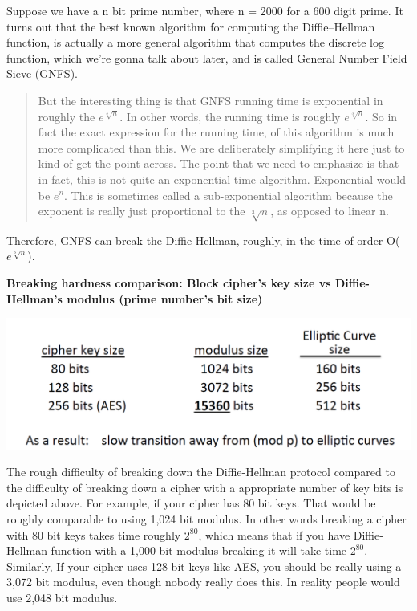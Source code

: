 \documentclass[11pt]{article}
\makeatletter
\def\maxwidth{\ifdim\Gin@nat@width>\linewidth\linewidth
    \else\Gin@nat@width\fi}
\let\Oldincludegraphics\includegraphics
\renewcommand{\includegraphics}[1]{\Oldincludegraphics[width=.8\maxwidth]{#1}}
\makeatother
\begin{document}
Suppose we have a n bit prime number, where n = 2000 for a 600 digit
prime. It turns out that the best known algorithm for computing the
Diffie--Hellman function, is actually a more general algorithm that
computes the discrete log function, which we're gonna talk about later,
and is called General Number Field Sieve (GNFS).

\begin{quote}
But the interesting thing is that GNFS running time is exponential in
roughly the \(e^\sqrt[3]{n}\). In other words, the running time is
roughly \(e^\sqrt[3]{n}\). So in fact the exact expression for the
running time, of this algorithm is much more complicated than this. We
are deliberately simplifying it here just to kind of get the point
across. The point that we need to emphasize is that in fact, this is not
quite an exponential time algorithm. Exponential would be \(e^{n}\).
This is sometimes called a sub-exponential algorithm because the
exponent is really just proportional to the \(\sqrt[3]{n}\), as opposed
to linear n.
\end{quote}

Therefore, GNFS can break the Diffie-Hellman, roughly, in the time of
order O(\(e^\sqrt[3]{n}\)).

\textbf{Breaking hardness comparison: Block cipher's key size vs
Diffie-Hellman's modulus (prime number's bit size)}

\includegraphics{./Images/DH-FxnHardness-2.png}

The rough difficulty of breaking down the Diffie-Hellman protocol
compared to the difficulty of breaking down a cipher with a appropriate
number of key bits is depicted above. For example, if your cipher has 80
bit keys. That would be roughly comparable to using 1,024 bit modulus.
In other words breaking a cipher with 80 bit keys takes time roughly
\(2^{80}\), which means that if you have Diffie-Hellman function with a
1,000 bit modulus breaking it will take time \(2^{80}\). Similarly, If
your cipher uses 128 bit keys like AES, you should be really using a
3,072 bit modulus, even though nobody really does this. In reality
people would use 2,048 bit modulus.
\end{document}
